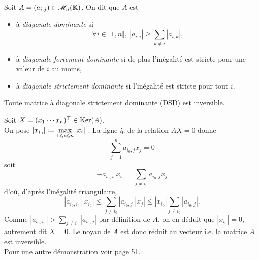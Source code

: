 \begin{defi}
    Soit $A = (a_{i,j}) \in \mathscr{M}_n(\mathbb{K})$. On dit que $A$ est 
    \begin{itemize}
        \item à \emph{diagonale dominante} si
        $$\forall i \in \llbracket 1, n \rrbracket,\ |a_{i,i}| \geqslant \sum_{k \not = i} |a_{i,k}|,$$
        \item à \emph{diagonale fortement dominante} si de plus l'inégalité est stricte pour une valeur de $i$ au moins,
        \item à \emph{diagonale strictement dominante} si l'inégalité est stricte pour tout $i$. 
    \end{itemize}
\end{defi}

\begin{lemme} \label{lemme_hadamard}
    Toute matrice à diagonale strictement dominante (DSD) est inversible.
\end{lemme}

\begin{preuve}
    Soit $X = (x_1 \cdots x_n)^\top \in \mathrm{Ker}(A)$. \\
    On pose $\displaystyle \left |x_{i_0} \right| \defeq \max_{1 \leqslant i \leqslant n} |x_i|$ . La ligne $i_0$ de la relation $AX = 0$ donne
    $$\sum_{j=1}^n a_{i_0,j}x_j = 0$$
    soit
    $$-a_{i_0, i_0} x_{i_0} = \sum_{j \not = i_0} a_{i_0,j} x_j$$
    d'où, d'après l'inégalité triangulaire,
    $$|a_{i_0, i_0}| |x_{i_0}| \leqslant \sum_{j \not = i_0} |a_{i_0,j}| |x_j| \leqslant |x_{i_0}| \sum_{j \not = i_0} |a_{i_0, j}|.$$
    Comme $|a_{i_0, i_0}| > \sum\limits_{j \not = i_0} |a_{i_0, j}|$ par définition de $A$, on en déduit que
    $|x_{i_0}| = 0$, autrement dit $X = 0$. Le noyau de $A$ est donc réduit au vecteur i.e. la matrice $A$ est inversible. \\
    Pour une autre démonstration voir \cite{matrices} page 51. 
\end{preuve}

\begin{marginfigure}
    
\end{marginfigure}


